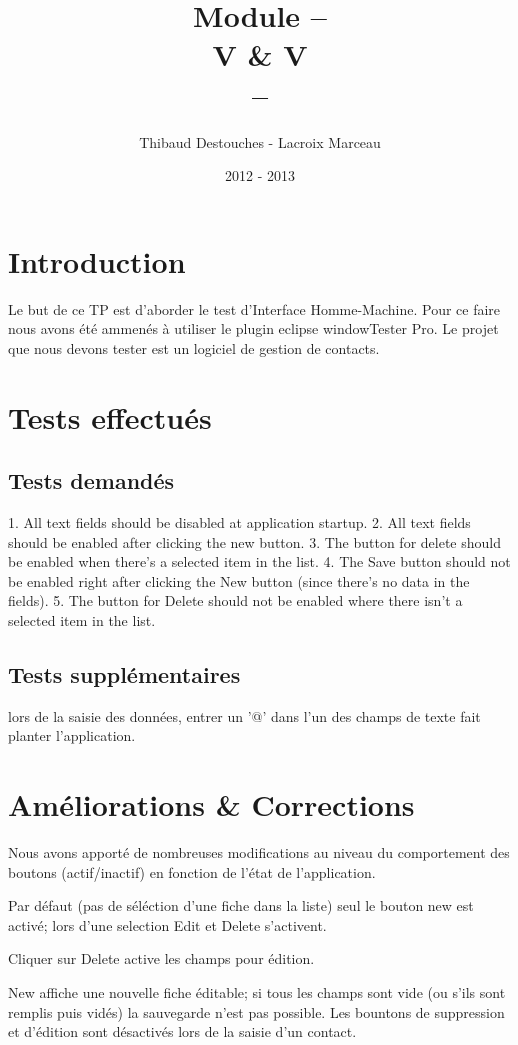 \documentclass{article}
\title{Module --
\\
V \& V
\\
--}
\author{Thibaud Destouches - Lacroix Marceau}
\date{2012 - 2013}
\begin{document}
\begin{titlepage}
\maketitle
\tableofcontents
\end{titlepage}

\newpage
\section{Introduction}

Le but de ce TP est d’aborder le test d’Interface Homme-Machine. Pour ce faire nous avons été ammenés à utiliser le plugin eclipse windowTester Pro. Le projet que nous devons tester est un logiciel de gestion de contacts.

\section{Tests effectués}

\subsection{Tests demandés}

1. All text fields should be disabled at application startup.
2. All text fields should be enabled after clicking the new button.
3. The button for delete should be enabled when there's a selected item in the list.
4. The Save button should not be enabled right after clicking the New button (since there's no data in the fields). 
5. The button for Delete should not be enabled where there isn't a selected item in the list.

\subsection{Tests supplémentaires}

lors de la saisie des données, entrer un '@' dans l'un des champs de texte fait planter l'application.	



\section{Améliorations \& Corrections}

Nous avons apporté de nombreuses modifications au niveau du comportement des boutons (actif/inactif) en fonction de l'état de l'application. 

Par défaut (pas de séléction d'une fiche dans la liste) seul le bouton new est activé; lors d'une selection Edit et Delete s'activent.

Cliquer sur Delete active les champs pour édition.

New affiche une nouvelle fiche éditable; si tous les champs sont vide (ou s'ils sont remplis puis vidés) la sauvegarde n'est pas possible. Les bountons de suppression et d'édition sont désactivés lors de la saisie d'un contact.
\newpage
\end{document}
